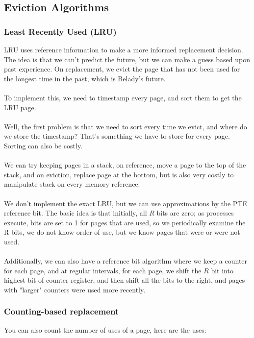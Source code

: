 \documentclass{article}
\begin{document}
\subsection{Eviction Algorithms}

\subsubsection{Least Recently Used (LRU)}

LRU uses reference information to make a more informed replacement decision. The idea is that we can't predict the future, but we can make a guess based upon past experience. On replacement, we evict the page that has not been used for the longest time in the past, which is Belady's future.\\
\\
To implement this, we need to timestamp every page, and sort them to get the LRU page.
\\
\\
Well, the first problem is that we need to sort every time we evict, and where do we store the timestamp? That's something we have to store for every page. Sorting can also be costly.
\\
\\
We can try keeping pages in a stack, on reference, move a page to the top of the stack, and on eviction, replace page at the bottom, but is also very costly to manipulate stack on every memory reference.\\
\\
We don't implement the exact LRU, but we can use approximations by the PTE reference bit. The basic idea is that initially, all $R$ bits are zero; as processes execute, bits are set to 1 for pages that are used, so we periodically examine the R bits, we do not know order of use, but we know pages that were or were not used.\\
\\
Additionally, we can also have a reference bit algorithm where we keep a counter for each page, and at regular intervals, for each page, we shift the $R$ bit into highest bit of counter register, and then shift all the bits to the right, and pages with "larger" counters were used more recently.

\subsubsection{Counting-based replacement}

You can also count the number of uses of a page, here are the uses:
\end{document}
